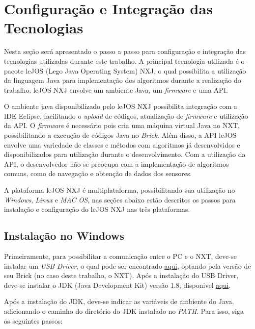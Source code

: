 \section{Configuração e Integração das Tecnologias}

Nesta seção será apresentado o passo a passo para configuração e integração das tecnologias utilizadas durante este trabalho. A principal tecnologia utilizada é o pacote leJOS (Lego Java Operating System) NXJ, o qual possibilita a utilização da linguagem Java para implementação dos algoritmos durante a realização do trabalho. leJOS NXJ envolve um ambiente Java, um \textit{firmware} e uma API.

O ambiente java disponibilizado pelo leJOS NXJ possibilita integração com a IDE Eclipse, facilitando o \textit{upload} de códigos, atualização de \textit{firmware} e utilização da API. O \textit{firmware} é necessário pois cria uma máquina virtual Java no NXT, possibilitando a execução de códigos Java no \textit{Brick}. Além disso, a API leJOS envolve uma variedade de classes e métodos com algoritmos já desenvolvidos e disponibilizados para utilização durante o desenvolvimento. Com a utilização da API, o desenvolvedor não se preocupa com a implementação de algoritmos comuns, como de navegação e obtenção de dados dos sensores.

A plataforma leJOS NXJ é multiplataforma, possibilitando sua utilização no \textit{Windows}, \textit{Linux} e \textit{MAC OS}, nas seções abaixo estão descritos os passos para instalação e configuração do leJOS NXJ nas três plataformas.

\subsection{Instalação no Windows} %
\label{sub:instalação_no_windows}

	Primeiramente, para possibilitar a comunicação entre o PC e o NXT, deve-se instalar um \textit{USB Driver}, o qual pode ser encontrado \href{https://www.lego.com/en-us/mindstorms/downloads}{aqui}, optando pela versão de seu Brick (no caso deste trabalho, o NXT). Após a instalação do USB Driver, deve-se instalar o JDK (Java Development Kit) versão 1.8, disponivel \href{http://www.oracle.com/technetwork/java/}{aqui}.

	Após a instalação do JDK, deve-se indicar as variáveis de ambiente do Java, adicionando o caminho do diretório do JDK instalado no \textit{PATH}. Para isso, siga os seguintes passos:

